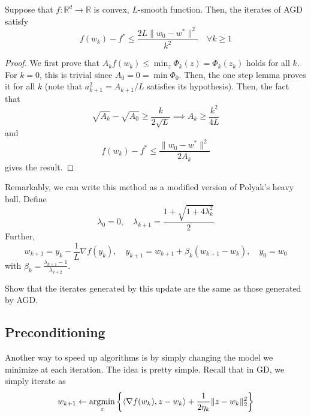 	\begin{theorem}[Convergence]
	  \label{thm:convergence}
		Suppose that $f: \mathbb{R}^d \to \mathbb{R}$ is convex, $L$-smooth function. Then, the iterates of AGD satisfy 
		\begin{equation}
			f(w_k) - f^\ast \leq \frac{2L \|w_0 - w^\ast\|^2}{k^2} \quad \forall k \geq 1
		\end{equation}
	\end{theorem}
	\begin{proof}
	  We first prove that $A_k f(w_k) \leq \min_z \Phi_k(z) = \Phi_k (z_k)$ holds for all $k$. For $k = 0$, this is trivial since $A_0 = 0 = \min \Phi_0$.  Then, the one step lemma proves it for all $k$ (note that $a_{k+1}^2 = A_{k+1}/L$ satisfies its hypothesis). Then, the fact that 
		\begin{equation}
			\sqrt{A_{k}} - \sqrt{A_0} \geq \frac{k}{2\sqrt{L}} \implies A_{k} \geq \frac{k^2}{4L}
		\end{equation}
		and 
		\begin{equation}
			f(w_k) - f^\ast \leq \frac{\|w_0 - w^\ast\|^2}{2 A_k}
		\end{equation}
		gives the result. 
	\end{proof}

	Remarkably, we can write this method as a modified version of Polyak's heavy ball. Define 
	\begin{equation}
		\lambda_0 = 0, \quad \lambda_{k+1} = \frac{1 + \sqrt{1 + 4 \lambda_k^2}}{2}
	\end{equation}
	Further, 
	\begin{equation}
		w_{k+1} = y_k - \frac{1}{L} \nabla f(y_k), \quad y_{k+1} = w_{k+1} + \beta_k (w_{k+1} - w_k), \quad y_0 = w_0
	\end{equation}
	with $\beta_k = \frac{\lambda_{k+1} - 1}{\lambda_{k+2}}$. 

	\begin{exercise}
	  Show that the iterates generated by this update are the same as those generated by AGD. 
	\end{exercise}

\subsection{Preconditioning}

	Another way to speed up algorithms is by simply changing the model we minimize at each iteration. The idea is pretty simple. Recall that in GD, we simply iterate as 
	\begin{equation}
		w_{k+1} \gets \operatorname*{\arg\!\min}_z \bigg\{ \langle \nabla f(w_k), z - w_k \rangle + \frac{1}{2\eta_k} \|z - w_k\|_2^2 \bigg\}
	\end{equation}

